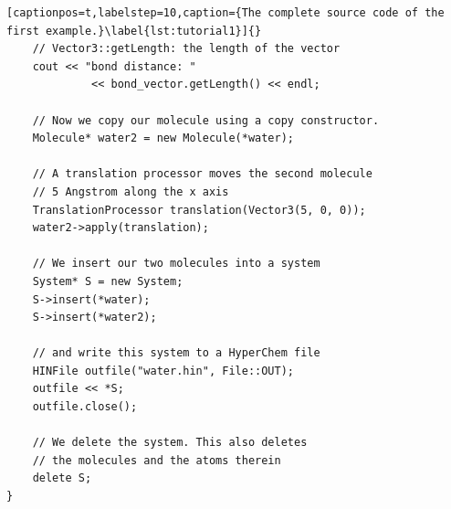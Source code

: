 \begin{lstlisting}[captionpos=t,labelstep=10,caption={The complete source code of the first example.}\label{lst:tutorial1}]{}
	// Vector3::getLength: the length of the vector
	cout << "bond distance: " 
			 << bond_vector.getLength() << endl;

	// Now we copy our molecule using a copy constructor.
	Molecule* water2 = new Molecule(*water);

	// A translation processor moves the second molecule
	// 5 Angstrom along the x axis
	TranslationProcessor translation(Vector3(5, 0, 0));
	water2->apply(translation);

	// We insert our two molecules into a system
	System* S = new System;
	S->insert(*water);
	S->insert(*water2);

	// and write this system to a HyperChem file
	HINFile outfile("water.hin", File::OUT);
	outfile << *S;
	outfile.close();

	// We delete the system. This also deletes 
	// the molecules and the atoms therein
	delete S;
}
\end{lstlisting}
